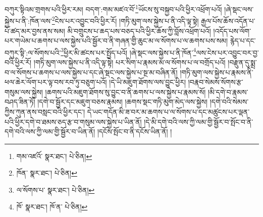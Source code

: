 བཀུར་སྟིའམ་གྲགས་པའི་ཕྱིར་རམ། བདག་:གམ་མཛའ་བོ་\footnote{གམ་འཛའོ་  སྣར་ཐང་།  པེ་ཅིན། }ཡོངས་སུ་བསྐྱབ་པའི་ཕྱིར་འཕྲོག་པའོ། །ཞེ་སྡང་ལས་སྐྱེས་པ་ནི་:ཁོན་ལས་\footnote{ཁོན་  སྣར་ཐང་།  པེ་ཅིན། }ངེས་པར་འབྱུང་བའི་ཕྱིར་རོ། །གཏི་མུག་ལས་སྐྱེས་པ་ནི་འདི་ལྟ་སྟེ། རྒྱལ་པོས་ཆོས་འདོན་པ་པོ་ཚད་མར་བྱས་ནས་སམ། མི་བགྲུངས་པ་ཆད་པས་བཅད་པའི་ཕྱིར་ཆོས་ཀྱི་བློས་འཕྲོག་པའོ། །འདོད་པས་ལོག་པར་གཡེམ་པ་ཆགས་པ་ལས་སྐྱེས་པའི་སྦྱོར་བ་ནི་གཞན་གྱི་ཆུང་མ་ལ་སོགས་པ་ལ་ཆགས་པས་སམ། རྙེད་པ་དང་བཀུར་སྟི་:ལ་སོགས་པའི་\footnote{ལ་སོགས་པ་  སྣར་ཐང་།  པེ་ཅིན། }ཕྱིར་མི་ཚངས་པར་སྤྱོད་པའོ། །ཞེ་སྡང་ལས་སྐྱེས་པ་ནི་ཁོན་\footnote{ཁོ་  སྣར་ཐང་། ཁོ་ན་  པེ་ཅིན། }ལས་ངེས་པར་འབྱུང་བར་བྱ་བའི་ཕྱིར་རོ། །གཏི་མུག་ལས་སྐྱེས་པ་ནི་འདི་ལྟ་སྟེ། པར་སིག་པ་རྣམས་མ་ལ་སོགས་པ་ལ་བགྲོད་པའོ། །བརྫུན་དུ་སྨྲ་བ་ལ་སོགས་པ་ཆགས་པ་ལས་སྐྱེས་པ་དང་ཞེ་སྡང་ལས་སྐྱེས་པ་སྔ་མ་བཞིན་ནོ། །གཏི་མུག་ལས་སྐྱེས་པ་རྣམས་ནི་ཕལ་ཆེར་ལོག་པར་ལྟ་བས་རབ་ཏུ་བཅུག་པའོ། །དེ་ཡི་མཇུག་ཐོགས་ལས་བྱུང་ཕྱིར། །བརྣབ་སེམས་སོགས་རྩ་གསུམ་ལས་སྐྱེས། །ཆགས་པའི་མཇུག་ཐོགས་སུ་བྱུང་བ་ནི་ཆགས་པ་ལས་སྐྱེས་པ་རྣམས་སོ། །མི་དགེ་བ་རྣམས་བཤད་ཟིན་ཏོ། །དགེ་བ་སྦྱོར་དང་མཇུག་བཅས་རྣམས། །ཆགས་སྡང་གཏི་མུག་མེད་ལས་སྐྱེས། །དགེ་བའི་སེམས་ཀྱིས་ཀུན་ནས་བསླང་བའི་ཕྱིར་དང་། དེ་ཡང་གདོན་མི་ཟ་བར་མ་ཆགས་པ་ལ་སོགས་པ་དང་མཚུངས་པར་ལྡན་པའི་ཕྱིར་དགེ་བ་ཐམས་ཅད་རྩ་བ་གསུམ་ལས་སྐྱེས་པ་ཡིན་ནོ། །དེ་མི་དགེ་བའི་ལས་ཀྱི་ལམ་གྱི་སྦྱོར་བ་སྤོང་བ་ནི་དགེ་བའི་ལས་ཀྱི་ལམ་གྱི་སྦྱོར་བ་ཡིན་ནོ། །དངོས་སྤོང་བ་ནི་དངོས་ཡིན་ནོ། །
